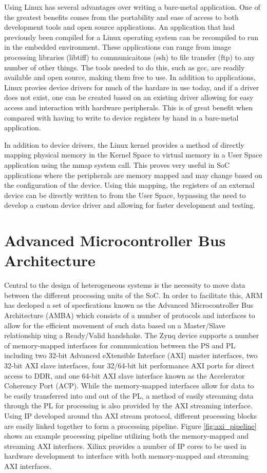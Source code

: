 Using Linux has several advantages over writing a bare-metal application.  One of the greatest benefits comes from the portability and ease of access to both development tools and open source applications.  An application that had previously been compiled for a Linux operating system can be recompiled to run in the embedded environment.  These applications can range from image processing libraries (libtiff) to communicaitons (ssh) to file transfer (ftp) to any number of other things.  The tools needed to do this, such as gcc, are readily available and open source, making them free to use.  In addition to applications, Linux provies device drivers for much of the hardare in use today, and if a driver does not exist, one can be created based on an existing driver allowing for easy access and interaction with hardware peripherals.  This is of great benefit when compared with having to write to device registers by hand in a bare-metal application.

In addition to device drivers, the Linux kernel provides a method of directly mapping physical memory in the Kernel Space to virtual memory in a User Space application using the mmap system call.  This proves very useful in SoC applications where the peripherals are memory mapped and may change based on the configuration of the device.  Using this mapping, the registers of an external device can be directly written to from the User Space, bypassing the need to develop a custom device driver and allowing for faster development and testing.

\section{Advanced Microcontroller Bus Architecture}
Central to the design of heterogeneous systems is the necessity to move data between the different processing units of the SoC.  In order to facilitate this, ARM has deeloped a set of specfications known as the Advanced Microcontroller Bus Architecture (AMBA) which consists of a number of protocols and interfaces to allow for the efficient movement of such data based on a Master/Slave relationship uing a Ready/Valid handshake.  The Zynq device supports a number of memory-mapped interfaces for communication between the PS and PL including two 32-bit Advanced eXtensible Interface (AXI) master interfaces, two 32-bit AXI slave interfaces, four 32/64-bit hit performance AXI ports for direct access to DDR, and one 64-bit AXI slave interface known as the Accelerator Coherency Port (ACP).  While the memory-mapped interfaces allow for data to be easily transferred into and out of the PL, a method of easily streaming data through the PL for processing is also provided by the AXI streaming interface.  Using IP developed around tha AXI stream protocol, different processing blocks are easily linked together to form a processing pipeline.  Figure \ref{fig:axi_pipeline} shows an example processing pipeline utilizing both the memory-mapped and streaming AXI interfaces.  Xilinx provides a number of IP cores to be used in hardware development to interface with both memory-mapped and streaming AXI interfaces.

